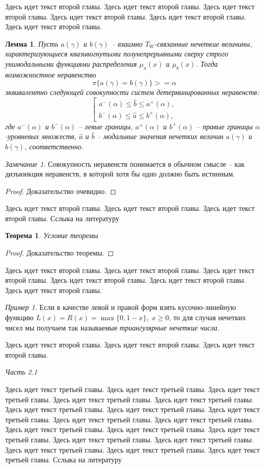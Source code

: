 \documentclass[a4paper,twoside]{article}
\newcommand{\subheader}[1]{\bigskip\medskip\noindent\emph{#1}\nopagebreak\bigskip}
\theoremstyle{theorem}
\newtheorem{theorem}{Теорема}
\newtheorem{lemma}{Лемма}
\theoremstyle{remark}
\newtheorem{remark}{Замечание}
\newtheorem{example}{Пример}
\begin{document}
Здесь идет текст второй главы. Здесь идет текст второй главы. Здесь идет текст второй главы.
Здесь идет текст второй главы. Здесь идет текст второй главы. Здесь идет текст второй главы.
\begin{lemma}
Пусть $a(\gamma)$ и $b(\gamma)$ -- взаимно $T_W$-связанные нечеткие величины, характеризующиеся квазивогнутыми полунепрерывными сверху строго унимодальными функциями распределения $\mu_a(x)$ и $\mu_b(x)$. Тогда возможностное неравенство
$$
\pi\{a(\gamma) = b(\gamma)\} >= \alpha
$$
эквивалентно следующей совокупности систем детерминированных неравенств:
$$
\left[\begin{array}{l}
a^-(\alpha) \leq \hat b \leq a^+(\alpha),\\
b^-(\alpha) \leq \hat a \leq b^+(\alpha),
\end{array}\right.
$$
где $a^-(\alpha)$ и $b^-(\alpha)$ -- левые границы, $a^+(\alpha)$ и $b^+(\alpha)$ -- правые границы $\alpha$-уровневых множеств, $\hat a$ и $\hat b$ -- модальные значения нечетких величин $a(\gamma)$ и $b(\gamma)$, соответственно.
\end{lemma}
\begin{remark}
Совокупность неравенств понимается в обычном смысле -- как дизъюнкция неравенств, в которой хотя бы одно должно быть истинным.
\end{remark}
\begin{proof}
Доказательство очевидно.
\end{proof}
Здесь идет текст второй главы. Здесь идет текст второй главы. Здесь идет текст второй главы.
Сслыка на литературу \cite{author:ref2}
\begin{theorem}
Условие теоремы
\end{theorem}
\begin{proof}
Доказательство теоремы.
\end{proof}
Здесь идет текст второй главы. Здесь идет текст второй главы. Здесь идет текст второй главы.
Здесь идет текст второй главы. Здесь идет текст второй главы. Здесь идет текст второй главы.
\begin{example}
Если в качестве левой и правой форм взять кусочно-линейную функцию $L(x) = R(x) = \max\{0, 1 - x\},\;x\geq 0$,
то для случая нечетких чисел мы получаем так называемые {\it триангулярные нечеткие числа}.
\end{example}
Здесь идет текст второй главы. Здесь идет текст второй главы. Здесь идет текст второй главы.


\subheader{Часть 2.1}

Здесь идет текст третьей главы. Здесь идет текст третьей главы. Здесь идет текст третьей главы.
Здесь идет текст третьей главы. Здесь идет текст третьей главы. Здесь идет текст третьей главы.
Здесь идет текст третьей главы. Здесь идет текст третьей главы. Здесь идет текст третьей главы.
Здесь идет текст третьей главы. Здесь идет текст третьей главы. Здесь идет текст третьей главы.
Здесь идет текст третьей главы. Здесь идет текст третьей главы. Здесь идет текст третьей главы.
Здесь идет текст третьей главы. Здесь идет текст третьей главы. Здесь идет текст третьей главы.
Сслыка на литературу \cite{author:ref3}
\end{document}
